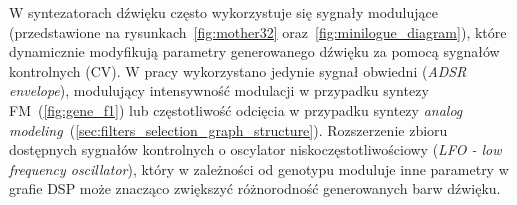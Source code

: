 W syntezatorach dźwięku często wykorzystuje się sygnały modulujące (przedstawione
na rysunkach~\ref{fig:mother32} oraz~\ref{fig:minilogue_diagram}), które dynamicznie
modyfikują parametry generowanego dźwięku za pomocą sygnałów kontrolnych (CV). 
W pracy wykorzystano jedynie sygnał obwiedni (\textit{ADSR envelope}),
modulujący intensywność modulacji w przypadku syntezy FM~(\ref{fig:gene_f1})
lub częstotliwość odcięcia w przypadku syntezy
\textit{analog modeling}~(\ref{sec:filters_selection_graph_structure}).
Rozszerzenie zbioru dostępnych sygnałów kontrolnych o oscylator niskoczęstotliwościowy
(\textit{LFO - low frequency oscillator}), który w zależności od genotypu
moduluje inne parametry w grafie DSP może znacząco zwiększyć różnorodność
generowanych barw dźwięku.



